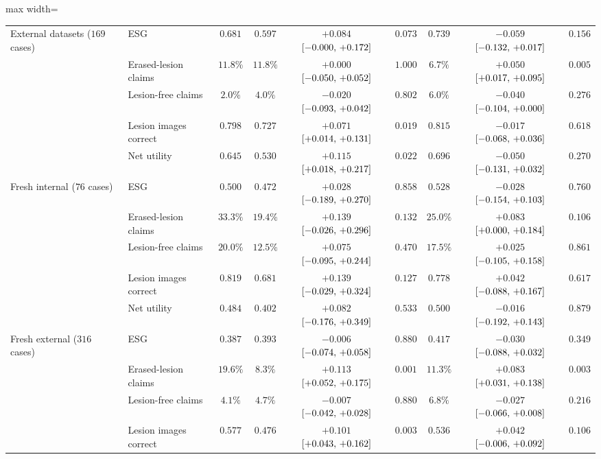 \begin{table}[!htbp]
\begin{adjustbox}{max width=\linewidth}
\begin{tabular}{ll c c cc c cc}
\midrule
External datasets ($169$ cases) & ESG & $0.681$ & $0.597$ & $+0.084$ $[-0.000,\,+0.172]$ & $0.073$ & $0.739$ & $-0.059$ $[-0.132,\,+0.017]$ & $0.156$ \\
 & Erased-lesion claims & $11.8\%$ & $11.8\%$ & $+0.000$ $[-0.050,\,+0.052]$ & $1.000$ & $6.7\%$ & $+0.050$ $[+0.017,\,+0.095]$ & $0.005$ \\
 & Lesion-free claims & $2.0\%$ & $4.0\%$ & $-0.020$ $[-0.093,\,+0.042]$ & $0.802$ & $6.0\%$ & $-0.040$ $[-0.104,\,+0.000]$ & $0.276$ \\
 & Lesion images correct & $0.798$ & $0.727$ & $+0.071$ $[+0.014,\,+0.131]$ & $0.019$ & $0.815$ & $-0.017$ $[-0.068,\,+0.036]$ & $0.618$ \\
 & Net utility & $0.645$ & $0.530$ & $+0.115$ $[+0.018,\,+0.217]$ & $0.022$ & $0.696$ & $-0.050$ $[-0.131,\,+0.032]$ & $0.270$ \\
\midrule
Fresh internal ($76$ cases) & ESG & $0.500$ & $0.472$ & $+0.028$ $[-0.189,\,+0.270]$ & $0.858$ & $0.528$ & $-0.028$ $[-0.154,\,+0.103]$ & $0.760$ \\
 & Erased-lesion claims & $33.3\%$ & $19.4\%$ & $+0.139$ $[-0.026,\,+0.296]$ & $0.132$ & $25.0\%$ & $+0.083$ $[+0.000,\,+0.184]$ & $0.106$ \\
 & Lesion-free claims & $20.0\%$ & $12.5\%$ & $+0.075$ $[-0.095,\,+0.244]$ & $0.470$ & $17.5\%$ & $+0.025$ $[-0.105,\,+0.158]$ & $0.861$ \\
 & Lesion images correct & $0.819$ & $0.681$ & $+0.139$ $[-0.029,\,+0.324]$ & $0.127$ & $0.778$ & $+0.042$ $[-0.088,\,+0.167]$ & $0.617$ \\
 & Net utility & $0.484$ & $0.402$ & $+0.082$ $[-0.176,\,+0.349]$ & $0.533$ & $0.500$ & $-0.016$ $[-0.192,\,+0.143]$ & $0.879$ \\
\midrule
Fresh external ($316$ cases) & ESG & $0.387$ & $0.393$ & $-0.006$ $[-0.074,\,+0.058]$ & $0.880$ & $0.417$ & $-0.030$ $[-0.088,\,+0.032]$ & $0.349$ \\
 & Erased-lesion claims & $19.6\%$ & $8.3\%$ & $+0.113$ $[+0.052,\,+0.175]$ & $0.001$ & $11.3\%$ & $+0.083$ $[+0.031,\,+0.138]$ & $0.003$ \\
 & Lesion-free claims & $4.1\%$ & $4.7\%$ & $-0.007$ $[-0.042,\,+0.028]$ & $0.880$ & $6.8\%$ & $-0.027$ $[-0.066,\,+0.008]$ & $0.216$ \\
 & Lesion images correct & $0.577$ & $0.476$ & $+0.101$ $[+0.043,\,+0.162]$ & $0.003$ & $0.536$ & $+0.042$ $[-0.006,\,+0.092]$ & $0.106$ \\

\end{tabular}
\end{adjustbox}
\end{table}
